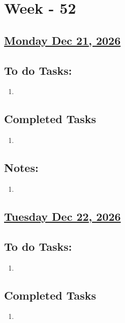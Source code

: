 \section{Week - 52}

\subsection*{\underline{Monday Dec 21, 2026}}
\subsection*{To do Tasks:}
\begin{enumerate}
    \item 
\end{enumerate}
\subsection*{Completed Tasks}
\begin{enumerate}[\ding{52}]  %
    \item 
\end{enumerate}
\subsection*{Notes:}
\begin{enumerate}
    \item 
\end{enumerate}
\subsection*{\underline{Tuesday Dec 22, 2026}}
\subsection*{To do Tasks:}
\begin{enumerate}
    \item  
\end{enumerate}
\subsection*{Completed Tasks}
\begin{enumerate}[\ding{52}]  %
    \item 
\end{enumerate}
